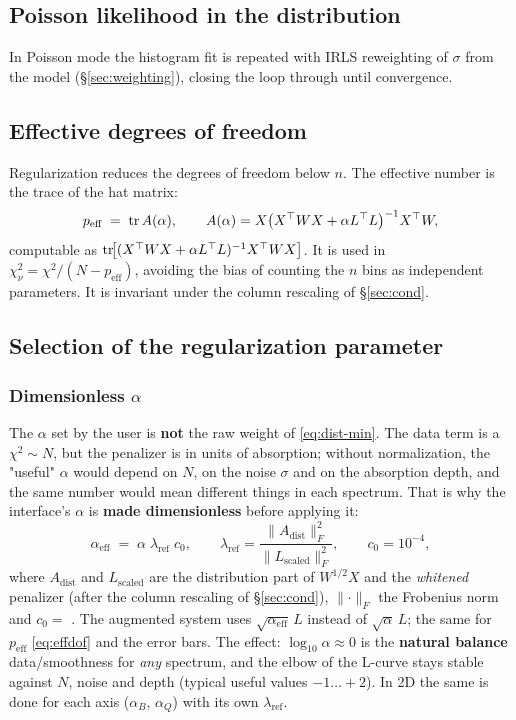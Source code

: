 \subsection{Poisson likelihood in the distribution}
In Poisson mode the histogram fit is repeated with IRLS reweighting of $\sigma$ from
the model (\S\ref{sec:weighting}), closing the loop through  until
convergence.

\subsection{Effective degrees of freedom}\label{sec:effdof}

Regularization reduces the degrees of freedom below $n$. The effective number is the
trace of the hat matrix:
\begin{equation}
  p_{\text{eff}} \;=\; \operatorname{tr} A(\alpha),\qquad
  A(\alpha)=X\bigl(X^\top W X+\alpha L^\top L\bigr)^{-1}X^\top W,
  \label{eq:effdof}
\end{equation}
computable as $\operatorname{tr}\!\bigl[(X^\top WX+\alpha L^\top L)^{-1}X^\top WX\bigr]$. It is used
in $\chi^2_\nu=\chi^2/(N-p_{\text{eff}})$, avoiding the bias of counting the $n$ bins
as independent parameters. It is invariant under the column rescaling of
\S\ref{sec:cond}.

\subsection{Selection of the regularization parameter}\label{sec:alpha}

\subsubsection{Dimensionless $\alpha$}\label{sec:alpha-dimless}
The $\alpha$ set by the user is \textbf{not} the raw weight of \eqref{eq:dist-min}.
The data term is a $\chi^2\sim N$, but the penalizer is in units of absorption;
without normalization, the "useful" $\alpha$ would depend on $N$, on the noise
$\sigma$ and on the absorption depth, and the same number would mean different
things in each spectrum. That is why the interface's $\alpha$ is
\textbf{made dimensionless} before applying it:
\begin{equation}
  \alpha_{\text{eff}} \;=\; \alpha\;\lambda_{\text{ref}}\;c_0,
  \qquad
  \lambda_{\text{ref}} = \frac{\lVert A_{\text{dist}}\rVert_F^2}{\lVert L_{\text{scaled}}\rVert_F^2},
  \qquad c_0 = 10^{-4},
\end{equation}
where $A_{\text{dist}}$ and $L_{\text{scaled}}$ are the distribution part of
$W^{1/2}X$ and the \emph{whitened} penalizer (after the column rescaling of
\S\ref{sec:cond}), $\lVert\cdot\rVert_F$ the Frobenius norm and $c_0=$
. The augmented system uses $\sqrt{\alpha_{\text{eff}}}\,L$
instead of $\sqrt\alpha\,L$; the same for $p_{\text{eff}}$ \eqref{eq:effdof} and the
error bars. The effect: $\log_{10}\alpha\approx 0$ is the \textbf{natural
balance} data/smoothness for \emph{any} spectrum, and the elbow of the L-curve
stays stable against $N$, noise and depth (typical useful values
$-1\ldots+2$). In 2D the same is done for each axis ($\alpha_B$, $\alpha_Q$) with
its own $\lambda_{\text{ref}}$.

